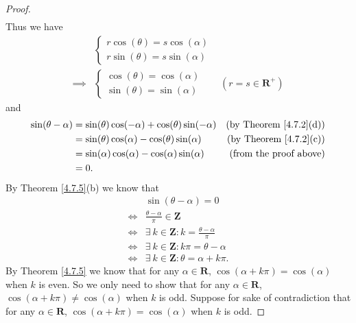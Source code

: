 \begin{proof}
\begin{align*}
    \end{align*}
    Thus we have
    \begin{align*}
                 & \begin{cases}
                       r \cos(\theta) = s \cos(\alpha) \\
                       r \sin(\theta) = s \sin(\alpha)
                   \end{cases}            \\
        \implies & \begin{cases}
                       \cos(\theta) = \cos(\alpha) \\
                       \sin(\theta) = \sin(\alpha)
                   \end{cases}     & (r = s \in \mathbf{R}^+)
    \end{align*}
    and
    \begin{align*}
        \sin(\theta - \alpha) & = \sin(\theta) \cos(-\alpha) + \cos(\theta) \sin(-\alpha) & \text{(by Theorem \ref{4.7.2}(d))} \\
                              & = \sin(\theta) \cos(\alpha) - \cos(\theta) \sin(\alpha)   & \text{(by Theorem \ref{4.7.2}(c))} \\
                              & = \sin(\alpha) \cos(\alpha) - \cos(\alpha) \sin(\alpha)   & \text{(from the proof above)}      \\
                              & = 0.
    \end{align*}
    By Theorem \ref{4.7.5}(b) we know that
    \begin{align*}
             & \sin(\theta - \alpha) = 0                                   \\
        \iff & \frac{\theta - \alpha}{\pi} \in \mathbf{Z}                  \\
        \iff & \exists\ k \in \mathbf{Z} : k = \frac{\theta - \alpha}{\pi} \\
        \iff & \exists\ k \in \mathbf{Z} : k \pi = \theta - \alpha         \\
        \iff & \exists\ k \in \mathbf{Z} : \theta = \alpha + k \pi.
    \end{align*}
    By Theorem \ref{4.7.5} we know that for any \(\alpha \in \mathbf{R}\), \(\cos(\alpha + k \pi) = \cos(\alpha)\) when \(k\) is even.
    So we only need to show that for any \(\alpha \in \mathbf{R}\), \(\cos(\alpha + k \pi) \neq \cos(\alpha)\) when \(k\) is odd.
    Suppose for sake of contradiction that for any \(\alpha \in \mathbf{R}\), \(\cos(\alpha + k \pi) = \cos(\alpha)\) when \(k\) is odd.

\end{proof}
